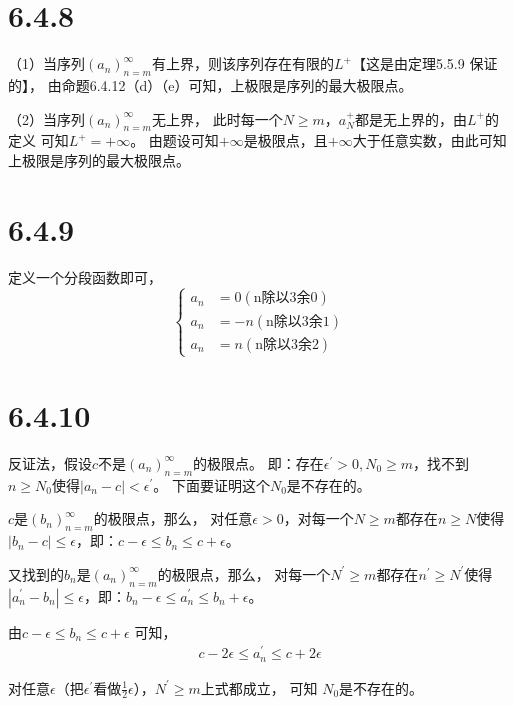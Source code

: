 \documentclass{article}
\theoremstyle{mystyle}
\begin{document}
\section*{6.4.8}

（1）当序列$(a_n)_{n=m}^\infty$有上界，则该序列存在有限的$L^+$【这是由定理5.5.9 保证的】，
由命题6.4.12（d）（e）可知，上极限是序列的最大极限点。

（2）当序列$(a_n)_{n=m}^\infty$无上界，
此时每一个$N \geq m$，$a_N^+$都是无上界的，由$L^+$的定义 可知$L^+ = +\infty$。
由题设可知$+\infty$是极限点，且$+\infty$大于任意实数，由此可知 上极限是序列的最大极限点。

\section*{6.4.9}

定义一个分段函数即可，
\begin{equation}
  \begin{cases*}
    a_n & = 0 (\text{n除以3余0})  \\
    a_n & = -n (\text{n除以3余1}) \\
    a_n & = n (\text{n除以3余2})
  \end{cases*}
\end{equation}

\section*{6.4.10}

反证法，假设$c$不是$(a_n)_{n=m}^\infty$的极限点。
即：存在$\epsilon ^\prime > 0, N_0 \geq m$，找不到$n \geq N_0$使得$|a_n - c| < \epsilon ^\prime$。
下面要证明这个$N_0$是不存在的。

$c$是$(b_n)_{n=m}^\infty$的极限点，那么，
对任意$\epsilon > 0$，对每一个$N \geq m$都存在$n \geq N$使得
$|b_n - c| \leq \epsilon$，即：$c - \epsilon \leq b_n \leq c + \epsilon$。

又找到的$b_n$是$(a_n)_{n=m}^\infty$的极限点，那么，
对每一个$N^\prime \geq m$都存在$n^\prime \geq N^\prime$使得
$|a_n^\prime - b_n| \leq \epsilon$，即：$b_n - \epsilon \leq a_n^\prime \leq b_n + \epsilon$。

由$c - \epsilon \leq b_n \leq c + \epsilon$ 可知，
\begin{align*}
  c - 2\epsilon \leq a_n^\prime \leq c + 2\epsilon
\end{align*}

对任意$\epsilon$（把$\epsilon ^\prime $看做$\frac{1}{2} \epsilon$），$N^\prime \geq m$上式都成立，
可知 $N_0$是不存在的。
\end{document}
